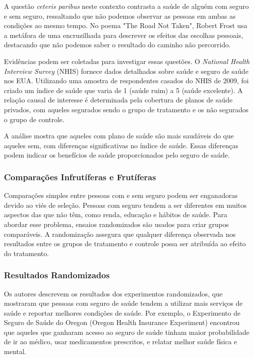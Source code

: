 \documentclass[a4paper,12pt]{article}[abntex2]
\begin{document}
A questão \textit{ceteris paribus} neste contexto contrasta a saúde de alguém com seguro e sem seguro, ressaltando que não podemos observar as pessoas em ambas as condições ao mesmo tempo. No poema "The Road Not Taken", Robert Frost usa a metáfora de uma encruzilhada para descrever os efeitos das escolhas pessoais, destacando que não podemos saber o resultado do caminho não percorrido.

Evidências podem ser coletadas para investigar essas questões. O \textit{National Health Interview Survey} (NHIS) fornece dados detalhados sobre saúde e seguro de saúde nos EUA. Utilizando uma amostra de respondentes casados do NHIS de 2009, foi criado um índice de saúde que varia de 1 (saúde ruim) a 5 (saúde excelente). A relação causal de interesse é determinada pela cobertura de planos de saúde privados, com aqueles segurados sendo o grupo de tratamento e os não segurados o grupo de controle.

A análise mostra que aqueles com plano de saúde são mais saudáveis do que aqueles sem, com diferenças significativas no índice de saúde. Essas diferenças podem indicar os benefícios de saúde proporcionados pelo seguro de saúde.


\subsubsection*{Comparações Infrutíferas e Frutíferas}

Comparações simples entre pessoas com e sem seguro podem ser enganadoras devido ao viés de seleção. Pessoas com seguro tendem a ser diferentes em muitos aspectos das que não têm, como renda, educação e hábitos de saúde. Para abordar esse problema, ensaios randomizados são usados para criar grupos comparáveis. A randomização assegura que qualquer diferença observada nos resultados entre os grupos de tratamento e controle possa ser atribuída ao efeito do tratamento.

\subsubsection*{Resultados Randomizados}

Os autores descrevem os resultados dos experimentos randomizados, que mostraram que pessoas com seguro de saúde tendem a utilizar mais serviços de saúde e reportar melhores condições de saúde. Por exemplo, o Experimento de Seguro de Saúde do Oregon (Oregon Health Insurance Experiment) encontrou que aqueles que ganharam acesso ao seguro de saúde tinham maior probabilidade de ir ao médico, usar medicamentos prescritos, e relatar melhor saúde física e mental.
\end{document}
